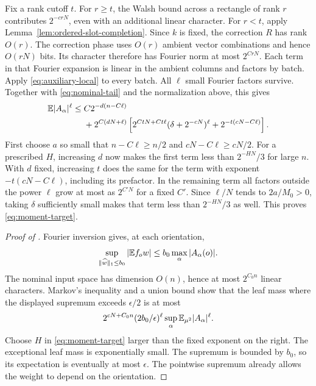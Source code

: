 Fix a rank cutoff \(t\). For \(r\ge t\), the Walsh bound across a rectangle of rank \(r\)
contributes \(2^{-crN}\), even with an additional linear character.
For \(r<t\), apply Lemma~\ref{lem:ordered-slot-completion}. Since \(k\) is
fixed, the correction \(R\) has rank \(O(r)\).
The correction phase uses \(O(r)\) ambient vector combinations and
hence \(O(rN)\) bits. Its character therefore has Fourier norm at most
\(2^{CrN}\). Each term in that Fourier expansion is linear in the
ambient columns and factors by batch. Apply \eqref{eq:auxiliary-local} to every batch. All
\(\ell\) small Fourier factors survive. Together with
\eqref{eq:nominal-tail} and the normalization above, this gives
\begin{align}\label{eq:assembled-moment}
 \mathbb E |A_\alpha|^\ell\le{}&C2^{-d(n-C\ell)}\\
 &+2^{C(dN+\ell)}
 \left[2^{CtN+Ct\ell}(\delta+2^{-cN})^\ell
                   +2^{-t(cN-C\ell)}\right].\notag
\end{align}
First choose \(a\) so small that \(n-C\ell\ge n/2\) and
\(cN-C\ell\ge cN/2\). For a prescribed \(H\), increasing \(d\) now
makes the first term less than \(2^{-HN}/3\) for large \(n\).
With \(d\) fixed, increasing \(t\) does the same for the term with
exponent \(-t(cN-C\ell)\), including its prefactor. In the remaining
term all factors outside the power \(\ell\) grow at most as \(2^{C'N}\)
for a fixed \(C'\). Since \(\ell/N\) tends to \(2a/M_0>0\), taking
\(\delta\) sufficiently small makes that term less than \(2^{-HN}/3\)
as well. This proves \eqref{eq:moment-target}.

\begin{proof}[Proof of ]
Fourier inversion gives, at each orientation,
\[
 \sup_{\|\widehat w\|_1\le b_0}|\mathbb E f_ow|
 \le b_0\max_\alpha|A_\alpha(o)|.
\]
The nominal input space has dimension \(O(n)\), hence at most \(2^{C_0n}\)
linear characters. Markov's inequality and a union bound show that the
leaf mass where the displayed supremum exceeds \(\epsilon/2\) is at most
\[
 2^{cN+C_0n}(2b_0/\epsilon)^\ell
       \sup_\alpha\mathbb E_{\mu^2}|A_\alpha|^\ell.
\]
Choose \(H\) in \eqref{eq:moment-target} larger than the fixed exponent
on the right. The exceptional leaf mass is exponentially small. The
supremum is bounded by \(b_0\), so its expectation is eventually at most
\(\epsilon\). The pointwise supremum already allows the weight to depend
on the orientation.
\end{proof}

